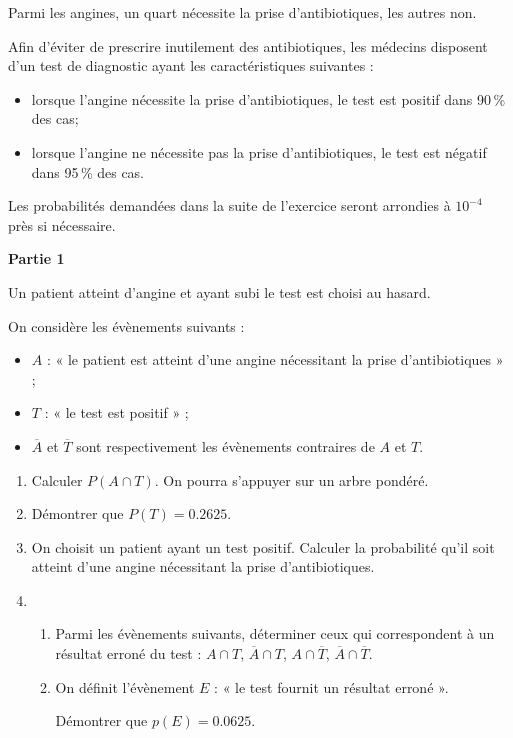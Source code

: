 Parmi les angines, un quart nécessite la prise d'antibiotiques, les autres non.

Afin d'éviter de prescrire inutilement des antibiotiques, les médecins disposent d'un test de diagnostic ayant les caractéristiques suivantes :

\begin{itemize}
	\item lorsque l'angine nécessite la prise d'antibiotiques, le test est positif dans 90\,\% des cas;
	\item lorsque l'angine ne nécessite pas la prise d'antibiotiques, le test est négatif dans 95\,\% des cas.
\end{itemize}

Les probabilités demandées dans la suite de l'exercice seront arrondies à $10^{-4}$ près si nécessaire.

\medskip

\textbf{Partie 1}

\medskip

Un patient atteint d'angine et ayant subi le test est choisi au hasard. 

On considère les évènements suivants :

\begin{itemize}
	\item $A$ : « le patient est atteint d'une angine nécessitant la prise d'antibiotiques »{} ; 
	\item $T$ : « le test est positif »{} ;
	\item $\overline{A}$ et $\overline{T}$ sont respectivement les évènements contraires de $A$ et $T$.
\end{itemize}

\begin{enumerate}
	\item Calculer $P(A \cap T)$. On pourra s'appuyer sur un arbre pondéré.
	\item Démontrer que $P(T) = \num{0,2625}$.
	\item On choisit un patient ayant un test positif. Calculer la probabilité qu'il soit atteint d'une angine nécessitant la prise d'antibiotiques.
	\item
	\begin{enumerate}
		\item Parmi les évènements suivants, déterminer ceux qui correspondent à un résultat erroné du test :  $A \cap T$, $\overline{A} \cap T$, $A \cap \overline{T}$, $\overline{A} \cap \overline{T}$.
		\item On définit l'évènement $E$ : « le test fournit un résultat erroné ». 
		
		Démontrer que $p(E) = \num{0,0625}$.
	\end{enumerate}
\end{enumerate}

